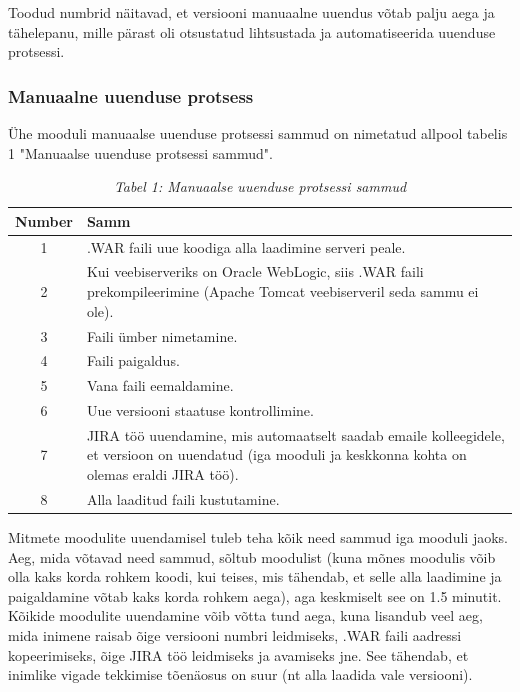 \documentclass[12pt]{report}
\begin{document}
  Toodud numbrid näitavad, et versiooni manuaalne uuendus võtab palju aega ja tähelepanu, mille pärast oli otsustatud lihtsustada ja automatiseerida uuenduse protsessi.
  
  \newpage
  \subsubsection{Manuaalne uuenduse protsess}
  
  Ühe mooduli manuaalse uuenduse protsessi sammud on nimetatud allpool tabelis 1 "Manuaalse uuenduse protsessi sammud".
  
  \begin{table}[H] 
  \begin{tabular}{ |c|p{11cm}| }
    \hline
    \textbf{Number} & \textbf{Samm}\\
    \hline
    1 & .WAR faili uue koodiga alla laadimine serveri peale.\\
    \hline
    2 & Kui veebiserveriks on Oracle WebLogic, siis .WAR faili prekompileerimine (Apache Tomcat veebiserveril seda sammu ei ole).\\
    \hline
    3 & Faili ümber nimetamine.\\
    \hline
    4 & Faili paigaldus.\\
    \hline
    5 & Vana faili eemaldamine.\\
    \hline
    6 & Uue versiooni staatuse kontrollimine.\\
    \hline
    7 & JIRA töö uuendamine, mis automaatselt saadab emaile kolleegidele, et versioon on uuendatud (iga mooduli ja keskkonna kohta on olemas eraldi JIRA töö).\\
    \hline
    8 & Alla laaditud faili kustutamine.\\
    \hline
  \end{tabular}
  \caption*{\textit{Tabel 1: Manuaalse uuenduse protsessi sammud}}
  \end{table}
  
  Mitmete moodulite uuendamisel tuleb teha kõik need sammud iga mooduli jaoks. Aeg, mida võtavad need sammud, sõltub moodulist (kuna mõnes moodulis võib olla kaks korda rohkem koodi, kui teises, mis tähendab, et selle alla laadimine ja paigaldamine võtab kaks korda rohkem aega), aga keskmiselt see on 1.5 minutit. Kõikide moodulite uuendamine võib võtta tund aega, kuna lisandub veel aeg, mida inimene raisab õige versiooni numbri leidmiseks, .WAR faili aadressi kopeerimiseks, õige JIRA töö leidmiseks ja avamiseks jne. See tähendab, et inimlike vigade tekkimise tõenäosus on suur (nt alla laadida vale versiooni).\\
  
\end{document}
